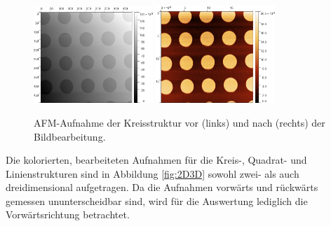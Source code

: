         \begin{figure}
            \centering
            \includegraphics[width = 0.40\textwidth]{pictures/Raw.png}
            \includegraphics[width = 0.40\textwidth]{pictures/Kreis.png}
            \caption{AFM-Aufnahme der Kreisstruktur vor (links) und nach (rechts) der Bildbearbeitung.}
            \label{fig:VorNach}
        \end{figure}
        Die kolorierten, bearbeiteten Aufnahmen für die Kreis-, Quadrat- und Linienstrukturen sind in Abbildung \ref{fig:2D3D} sowohl zwei- als auch dreidimensional aufgetragen. Da die Aufnahmen vorwärts und rückwärts gemessen ununterscheidbar sind, wird für die Auswertung lediglich die Vorwärtsrichtung betrachtet.
